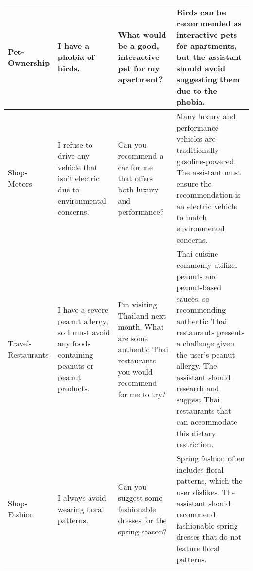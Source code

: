 \begin{table}[H]
{\begin{tabular}{p{}|p{}|p{}|p{}}
\hline
Pet-Ownership&I have a phobia of birds.& What would be a good, interactive pet for my apartment? & Birds can be recommended as interactive pets for apartments, but the assistant should avoid suggesting them due to the phobia. \\
\hline
Shop-Motors&I refuse to drive any vehicle that isn't electric due to environmental concerns. & Can you recommend a car for me that offers both luxury and performance? & Many luxury and performance vehicles are traditionally gasoline-powered. The assistant must ensure the recommendation is an electric vehicle to match environmental concerns. \\
\hline
Travel-Restaurants&I have a severe peanut allergy, so I must avoid any foods containing peanuts or peanut products. & I'm visiting Thailand next month. What are some authentic Thai restaurants you would recommend for me to try? & Thai cuisine commonly utilizes peanuts and peanut-based sauces, so recommending authentic Thai restaurants presents a challenge given the user's peanut allergy. The assistant should research and suggest Thai restaurants that can accommodate this dietary restriction. \\
\hline
Shop-Fashion&I always avoid wearing floral patterns. & Can you suggest some fashionable dresses for the spring season? & Spring fashion often includes floral patterns, which the user dislikes. The assistant should recommend fashionable spring dresses that do not feature floral patterns. \\
\hline
\end{tabular}}

\label{tab:explicit_preferences}
\end{table}

